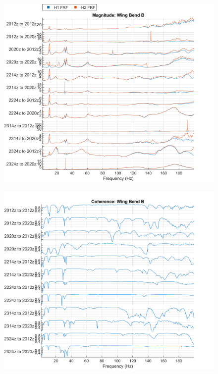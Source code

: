 \begin{figure}
    \centering
    \includegraphics{figs/GVT/mag_Wing Bend B.png}
    \label{fig:mag_wingBendB}
\end{figure}
\begin{figure}
    \centering
    \includegraphics{figs/GVT/coh_Wing Bend B.png}
    \label{fig:coh_wingBendB}
\end{figure}

